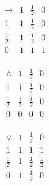 \begin{definicao}
            \noindent
            \begin{minipage}{0.3\textwidth}
                \[
                    \begin{array}{c|ccc}
                        \rightarrow & 1 & \frac{1}{2} & 0 \\
                        \hline
                        1           & 1 & \frac{1}{2} & 0 \\
                        \frac{1}{2} & 1 & \frac{1}{2} & 0 \\
                        0           & 1 & 1           & 1 \\
                    \end{array}
                \]
            \end{minipage}
            \begin{minipage}{0.3\textwidth}
                \[
                    \begin{array}{c|ccc}
                        \land       & 1           & \frac{1}{2} & 0 \\
                        \hline
                        1           & 1           & \frac{1}{2} & 0 \\
                        \frac{1}{2} & \frac{1}{2} & \frac{1}{2} & 0 \\
                        0           & 0           & 0           & 0 \\
                    \end{array}
                \]
            \end{minipage}
            \begin{minipage}{0.3\textwidth}
                \[
                    \begin{array}{c|ccc}
                        \lor        & 1 & \frac{1}{2} & 0           \\
                        \hline
                        1           & 1 & 1           & 1           \\
                        \frac{1}{2} & 1 & \frac{1}{2} & \frac{1}{2} \\
                        0           & 1 & \frac{1}{2} & 0           \\
                    \end{array}
                \]
            \end{minipage}

            \vspace{0.5cm}


\end{definicao}
